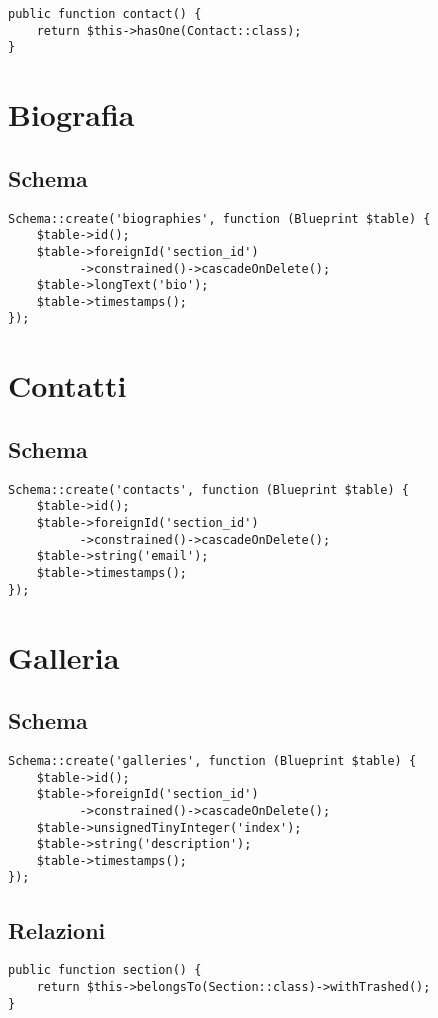 \begin{lstlisting}
public function contact() {
	return $this->hasOne(Contact::class);
}
\end{lstlisting}

\newpage
\section{Biografia}
\subsection{Schema}
\begin{lstlisting}
Schema::create('biographies', function (Blueprint $table) {
	$table->id();
	$table->foreignId('section_id')
	      ->constrained()->cascadeOnDelete();
	$table->longText('bio');
	$table->timestamps();
});
\end{lstlisting}


\section{Contatti}
\subsection{Schema}
\begin{lstlisting}
Schema::create('contacts', function (Blueprint $table) {
	$table->id();
	$table->foreignId('section_id')
	      ->constrained()->cascadeOnDelete();
	$table->string('email');
	$table->timestamps();
});
\end{lstlisting}
\section{Galleria}
\subsection{Schema}
\begin{lstlisting}
Schema::create('galleries', function (Blueprint $table) {
	$table->id();
	$table->foreignId('section_id')
	      ->constrained()->cascadeOnDelete();
	$table->unsignedTinyInteger('index');
	$table->string('description');
	$table->timestamps();
});
\end{lstlisting}
\newpage
\subsection{Relazioni}
\begin{lstlisting}
public function section() {
	return $this->belongsTo(Section::class)->withTrashed();
}
\end{lstlisting}

